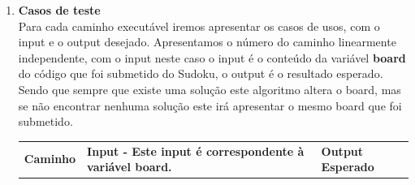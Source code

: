 \documentclass{article}
\begin{document}
\begin{itemize}
\begin{enumerate}
\begin{itemize}
  \end{itemize}
    \item \textbf{Casos de teste}\\
    \quad Para cada caminho executável iremos apresentar os casos de usos, com o input e o output
desejado.
\quad Apresentamos o número do caminho linearmente independente, com o input neste caso o input é o conteúdo da variável \textbf{board} do código que foi submetido do Sudoku, o output é o resultado esperado. Sendo que sempre que existe uma solução este algoritmo altera o board, mas se não encontrar nenhuma solução este irá apresentar o mesmo board que foi submetido.
\begin{table}[H]
    \centering
    \begin{tabular}{|c|p{7cm}|p{3cm}|} %
    \hline
    \renewcommand{\arraystretch}{1.8}
    \textbf{Caminho} & \textbf{Input - Este input é correspondente à variável board.} & \textbf{Output Esperado} \\
                        

\end{tabular}
\end{table}
\end{enumerate}
\end{itemize}
\end{document}
